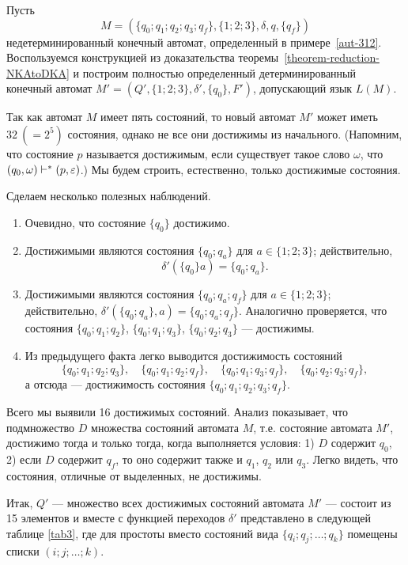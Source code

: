 \begin{myexample}
\label{example-NKAtoDKA-321}\label{aut-313}
Пусть
\[
M=(\{q_0;q_1;q_2;q_3;q_f\},\{1;2;3\},\delta,q,\{q_f\})
\]
недетерминированный конечный автомат, определенный в примере~\ref{aut-312}. Воспользуемся конструкцией из доказательства теоремы~\ref{theorem-reduction-NKAtoDKA} и построим полностью определенный детерминированный конечный автомат $M'=(Q',\{1;2;3\},\delta',\{q_0\},F')$, допускающий язык $L(M)$.

Так как автомат $M$ имеет пять состояний, то новый автомат $M'$ может иметь $32~(=2^5)$ состояния, однако не все они достижимы из начального. (Напомним, что состояние $p$ называется достижимым, если существует такое слово $\omega$, что $(q_0,\omega)\vdash^*(p,\varepsilon)$.) Мы будем строить, естественно, только достижимые состояния.

Сделаем несколько полезных наблюдений.
\begin{enumerate}
    \item Очевидно, что состояние $\{q_0\}$ достижимо.

    \item Достижимыми являются состояния $\{q_0;q_a\}$ для
    $a\in \{1;2;3\}$; действительно,
    \[
        \delta'(\{q_0\}a)=\{q_0;q_a\}.
    \]

    \item Достижимыми являются состояния $\{q_0;q_a;q_f\}$ для $a\in\{1;2;3\}$; действительно, $\delta'(\{q_0;q_a\},a)=\{q_0;q_a;q_f\}$. Аналогично проверяется, что состояния $\{q_0;q_1;q_2\}$, $\{q_0;q_1;q_3\}$, $\{q_0;q_2;q_3\}$ --- достижимы.

    \item Из предыдущего факта легко выводится достижимость состояний
    \[
        \{q_0;q_1;q_2;q_3\}, \quad \{q_0;q_1;q_2;q_f\}, \quad
        \{q_0;q_1;q_3;q_f\}, \quad \{q_0;q_2;q_3;q_f\},
    \]
    а отсюда --- достижимость состояния $\{q_0;q_1;q_2;q_3;q_f\}$.
\end{enumerate}

Всего мы выявили 16 достижимых состояний. Анализ показывает, что подмножество $D$ множества состояний автомата $M$, т.е. состояние автомата $M'$, достижимо тогда и только тогда, когда выполняется условия: 1) $D$ содержит $q_0$, 2) если $D$ содержит $q_f$, то оно содержит также и $q_1$, $q_2$ или $q_3$. Легко видеть, что состояния, отличные от выделенных, не достижимы.

Итак, $Q'$ --- множество всех достижимых состояний автомата $M'$ --- состоит из 15 элементов и вместе с функцией переходов $\delta'$ представлено в следующей таблице \ref{tab3}, где для простоты вместо состояний вида $\{q_i;q_j;\ldots ;q_k\}$ помещены списки $(i;j;\ldots ;k)$.


\end{myexample}
